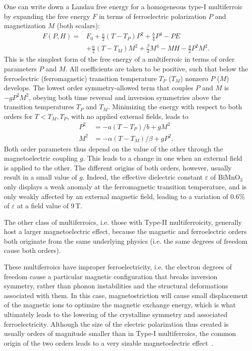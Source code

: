 One can write down a Landau free energy for a homogeneous type-I multiferroic by expanding the free energy $F$ in terms of ferroelectric polarization $P$ and magnetization $M$ (both scalars):
\begin{align}
	F(P, H) =& F_0 + \frac{a}{2} (T-T_P) P^2 + \frac{b}{4} P^4 - P E \\
	&+\frac{\alpha}{2} (T-T_M)M^2 + \frac{\beta}{4} M^4 - MH - \frac{g}{2}P^2 M^2.
\end{align}
This is the simplest form of the free energy of a multiferroic in terms of order parameters $P$ and $M$.
All coefficients are taken to be positive, such that below the ferroelectric (ferromagnetic) transition temperature $T_P$ ($T_M$) nonzero $P$ ($M$) develops.
The lowest order symmetry-allowed term that couples $P$ and $M$ is $-gP^2M^2$, obeying both time reversal and inversion symmetries above the transition temperatures $T_P$ and $T_M$.
Minimizing the energy with respect to both orders for $T<T_M,T_P$, with no applied external fields, leads to
\begin{align}
	P^2 &= - a(T-T_P)/b + gM^2\\
	M^2 &= - \alpha(T-T_M)/\beta + gP^2.
\end{align}
Both order parameters thus depend on the value of the other through the magnetoelectric coupling $g$. This leads to a change in one when an external field is applied to the other.
The different origins of both orders, however, usually result in a small value of $g$. Indeed, the effective dielectric constant $\varepsilon$ of BiMnO$_3$ only displays a weak anomaly at the ferromagnetic transition temperature, and is only weakly affected by an external magnetic field, leading to a variation of 0.6\% of $\varepsilon$ at a field value of 9\,T.

The other class of multiferroics, i.e. those with Type-II multiferroicity, generally host a larger magnetoelectric effect, because the magnetic and ferroelectric orders both originate from the same underlying physics (i.e. the same degrees of freedom cause both orders).

These multiferroics have improper ferroelectricity, i.e. the electron degrees of freedom cause a particular magnetic configuration that breaks inversion symmetry, rather than phonon instabilities and the structural deformations associated with them.
In this case, magnetostriction will cause small displacement of the magnetic ions to optimize the magnetic exchange energy, which is what ultimately leads to the lowering of the crystalline symmetry and associated ferroelectricity.  
Although the size of the electric polarization thus created is usually orders of magnitude smaller than in Type-I multiferroics, the common origin of the two orders leads to a very sizable magnetoelectric effect~\cite{Oh2014}.

